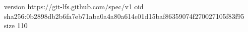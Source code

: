 version https://git-lfs.github.com/spec/v1
oid sha256:0b2898db2b6fa7eb71aba0a4a80a614e01d15baf86359074f270027105f83f95
size 110
